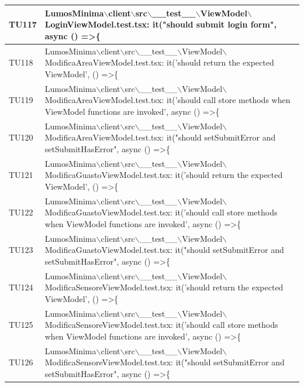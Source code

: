 \documentclass[12pt]{article}
\begin{document}
\begin{scriptsize}
\begin{xltabular}{\linewidth}{|>{\hsize}X|X|}
	TU117 & LumosMinima$\backslash$client$\backslash$src$\backslash$\_\_test\_\_$\backslash$ViewModel$\backslash$LoginViewModel.test.tsx: it("should submit login form", async () =\textgreater \{ \\ \hline
	TU118 & LumosMinima$\backslash$client$\backslash$src$\backslash$\_\_test\_\_$\backslash$ViewModel$\backslash$ModificaAreaViewModel.test.tsx: it('should return the expected ViewModel', () =\textgreater \{ \\ \hline
	TU119 & LumosMinima$\backslash$client$\backslash$src$\backslash$\_\_test\_\_$\backslash$ViewModel$\backslash$ModificaAreaViewModel.test.tsx: it('should call store methods when ViewModel functions are invoked', async () =\textgreater \{ \\ \hline
	TU120 & LumosMinima$\backslash$client$\backslash$src$\backslash$\_\_test\_\_$\backslash$ViewModel$\backslash$ModificaAreaViewModel.test.tsx: it("should setSubmitError and setSubmitHasError", async () =\textgreater \{ \\ \hline
	TU121 & LumosMinima$\backslash$client$\backslash$src$\backslash$\_\_test\_\_$\backslash$ViewModel$\backslash$ModificaGuastoViewModel.test.tsx: it('should return the expected ViewModel', () =\textgreater \{ \\ \hline
	TU122 & LumosMinima$\backslash$client$\backslash$src$\backslash$\_\_test\_\_$\backslash$ViewModel$\backslash$ModificaGuastoViewModel.test.tsx: it('should call store methods when ViewModel functions are invoked', async () =\textgreater \{ \\ \hline
	TU123 & LumosMinima$\backslash$client$\backslash$src$\backslash$\_\_test\_\_$\backslash$ViewModel$\backslash$ModificaGuastoViewModel.test.tsx: it("should setSubmitError and setSubmitHasError", async () =\textgreater \{ \\ \hline
	TU124 & LumosMinima$\backslash$client$\backslash$src$\backslash$\_\_test\_\_$\backslash$ViewModel$\backslash$ModificaSensoreViewModel.test.tsx: it('should return the expected ViewModel', () =\textgreater \{ \\ \hline
	TU125 & LumosMinima$\backslash$client$\backslash$src$\backslash$\_\_test\_\_$\backslash$ViewModel$\backslash$ModificaSensoreViewModel.test.tsx: it('should call store methods when ViewModel functions are invoked', async () =\textgreater \{ \\ \hline
	TU126 & LumosMinima$\backslash$client$\backslash$src$\backslash$\_\_test\_\_$\backslash$ViewModel$\backslash$ModificaSensoreViewModel.test.tsx: it("should setSubmitError and setSubmitHasError", async () =\textgreater \{ \\ \hline
\end{xltabular}
\end{scriptsize}
\end{document}
